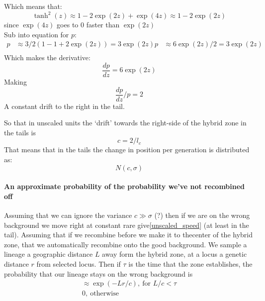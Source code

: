 \documentclass[12pt]{article}
\newcommand{\gc}[1]{{\em \color{blue} {Graham: #1} }}
\newcommand{\as}[1]{{\em \color{red} {Alisa: #1}}}
\begin{document}
Which means that:
\begin{equation}
\tanh^2(z) \approx 1 - 2\exp(2z) + \exp(4z) \approx 1 - 2\exp(2z)
\end{equation}
since $\exp(4z)$ goes to $0$ faster than  $\exp(2z)$\\

Sub into equation for $p$:
\begin{eqnarray}
 p &\approx 3/2(1-  1 + 2\exp(2z)) = 3\exp(2z)
 p &\approx  6\exp(2z)/2 = 3\exp(2z)\\
\end{eqnarray}
Which makes the derivative:
\begin{equation}
\frac{dp}{dz} = 6\exp(2z)
\end{equation}
Making
\begin{equation}
\frac{dp}{dz}/p = 2 \label{scaled_speed}
\end{equation}
A constant drift to the right in the tail.

So that in unscaled units the `drift' towards the right-side of the
hybrid zone in the tails  is
\begin{equation}
c= 2/l_c   \label{unscaled_speed}
\end{equation}
That means that in the tails the change in position per generation is
distributed as:
\begin{equation}
N(c,\sigma)
\end{equation}
\paragraph{An approximate probability of the probability we've not  recombined off}
Assuming that we can ignore the variance $c \gg \sigma$ (?) then if we are on the wrong background we move right at constant rare give\eqref{unscaled_speed} (at least in the tail). Assuming that if we recombine before we make it to thecenter of the hybrid zone, that we automatically recombine onto the good background. We sample a lineage a geographic distance $L$ away form the hybrid zone, at a locus a genetic distance $r$ from selected locus. Then if $\tau$ is the time that the zone establishes, the probability that our lineage stays on the wrong background is
\begin{eqnarray}
\approx \exp( - L r / c ), ~\textrm{for~}  L/c <\tau\\
0,~ \textrm{otherwise}\\
\end{eqnarray}
\end{document}
